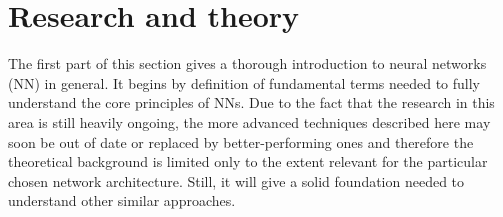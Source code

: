 \chapter{Research and theory}
\label{research}
The first part of this section gives a thorough introduction to neural networks (NN) in general. It begins by definition of fundamental terms needed to fully understand the core principles of NNs. Due to the fact that the research in this area is still heavily ongoing, the more advanced techniques described here may soon be out of date or replaced by better-performing ones and therefore the theoretical background is limited only to the extent relevant for the particular chosen network architecture. Still, it will give a solid foundation needed to understand other similar approaches. 

        
